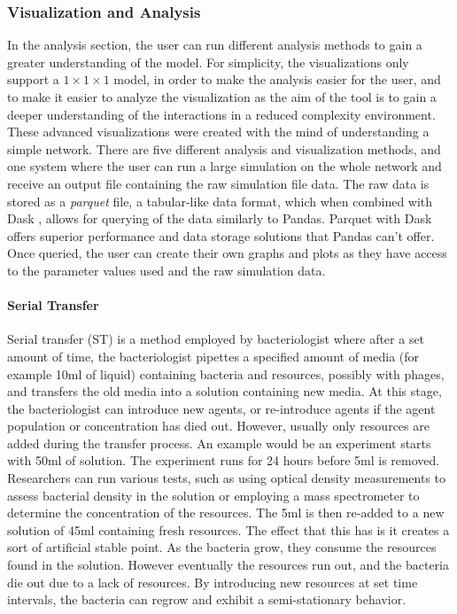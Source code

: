 \subsubsection{Visualization and Analysis}
In the analysis section, the user can run different analysis methods to gain a greater understanding of the model.
For simplicity, the visualizations only support a $1 \times 1\times 1$ model, in order to make the analysis easier for the user, and to make it easier to analyze the visualization as the aim of the tool is to gain a deeper understanding of the interactions in a reduced complexity environment. 
These advanced visualizations were created with the mind of understanding a simple network.
There are five different analysis and visualization methods, and one system where the user can run a large simulation on the whole network and receive an output file containing the raw simulation file data.
The raw data is stored as a \textit{parquet} file, a tabular-like data format, which when combined with Dask \cite{DaskDaskDocumentation}, allows for querying of the data similarly to Pandas.
Parquet with Dask offers superior performance and data storage solutions that Pandas can't offer.
Once queried, the user can create their own graphs and plots as they have access to the parameter values used and the raw simulation data.

\paragraph{Serial Transfer}
\label{sec:serial_transfer}
Serial transfer (ST) is a method employed by bacteriologist where after a set amount of time, the bacteriologist pipettes a specified amount of media (for example 10ml of liquid) containing bacteria and resources, possibly with phages, and transfers the old media into a solution containing new media.
At this stage, the bacteriologist can introduce new agents, or re-introduce agents if the agent population or concentration has died out.
However, usually only resources are added during the transfer process.
An example would be an experiment starts with 50ml of solution.
The experiment runs for 24 hours before 5ml is removed.
Researchers can run various tests, such as using optical density measurements to assess bacterial density in the solution or employing a mass spectrometer to determine the concentration of the resources.
The 5ml is then re-added to a new solution of 45ml containing fresh resources.
The effect that this has is it creates a sort of artificial stable point.
As the bacteria grow, they consume the resources found in the solution.
However eventually the resources run out, and the bacteria die out due to a lack of resources.
By introducing new resources at set time intervals, the bacteria can regrow and exhibit a semi-stationary behavior.

